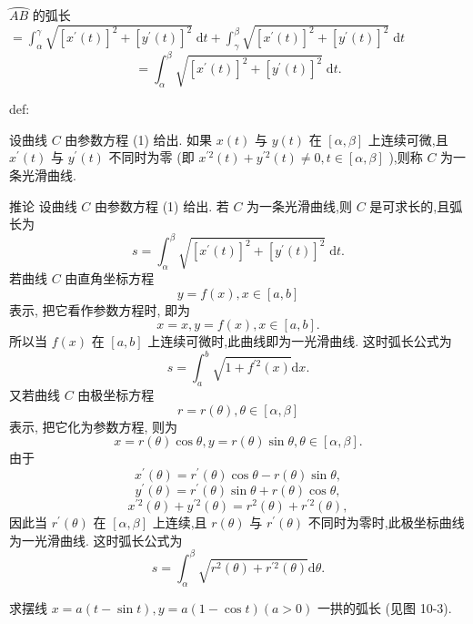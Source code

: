 \(\overset{⏜}{AB}\) 的弧长 \(= {\int }_{\alpha }^{\gamma }\sqrt{{\left\lbrack  {x}^{\prime }\left( t\right) \right\rbrack  }^{2} + {\left\lbrack  {y}^{\prime }\left( t\right) \right\rbrack  }^{2}}\mathrm{\;d}t + {\int }_{\gamma }^{\beta }\sqrt{{\left\lbrack  {x}^{\prime }\left( t\right) \right\rbrack  }^{2} + {\left\lbrack  {y}^{\prime }\left( t\right) \right\rbrack  }^{2}}\mathrm{\;d}t\)
\[
= {\int }_{\alpha }^{\beta }\sqrt{{\left\lbrack  {x}^{\prime }\left( t\right) \right\rbrack  }^{2} + {\left\lbrack  {y}^{\prime }\left( t\right) \right\rbrack  }^{2}}\mathrm{\;d}t.
\]
\begin{definition}{}{def:}

\end{definition}
设曲线 \(C\) 由参数方程 (1) 给出. 如果 \(x\left( t\right)\) 与 \(y\left( t\right)\) 在 \(\left\lbrack  {\alpha ,\beta }\right\rbrack\) 上连续可微,且 \({x}^{\prime }\left( t\right)\) 与 \({y}^{\prime }\left( t\right)\) 不同时为零 (即 \({x}^{\prime 2}\left( t\right)  + {y}^{\prime 2}\left( t\right)  \neq  0,t \in  \left\lbrack  {\alpha ,\beta }\right\rbrack\) ),则称 \(C\) 为一条光滑曲线.

推论 设曲线 \(C\) 由参数方程 (1) 给出. 若 \(C\) 为一条光滑曲线,则 \(C\) 是可求长的,且弧长为
\[
s = {\int }_{\alpha }^{\beta }\sqrt{{\left\lbrack  {x}^{\prime }\left( t\right) \right\rbrack  }^{2} + {\left\lbrack  {y}^{\prime }\left( t\right) \right\rbrack  }^{2}}\mathrm{\;d}t.
\]
若曲线 \(C\) 由直角坐标方程
\[
y = f\left( x\right) ,x \in  \left\lbrack  {a,b}\right\rbrack
\]
表示, 把它看作参数方程时, 即为
\[
x = x,y = f\left( x\right) ,x \in  \left\lbrack  {a,b}\right\rbrack  .
\]
所以当 \(f\left( x\right)\) 在 \(\left\lbrack  {a,b}\right\rbrack\) 上连续可微时,此曲线即为一光滑曲线. 这时弧长公式为
\[
s = {\int }_{a}^{b}\sqrt{1 + {f}^{\prime 2}\left( x\right) }\mathrm{d}x. \tag{4}
\]
又若曲线 \(C\) 由极坐标方程
\[
r = r\left( \theta \right) ,\theta  \in  \left\lbrack  {\alpha ,\beta }\right\rbrack
\]
表示, 把它化为参数方程, 则为
\[
x = r\left( \theta \right) \cos \theta ,y = r\left( \theta \right) \sin \theta ,\theta  \in  \left\lbrack  {\alpha ,\beta }\right\rbrack  .
\]
由于
\[
{x}^{\prime }\left( \theta \right)  = {r}^{\prime }\left( \theta \right) \cos \theta  - r\left( \theta \right) \sin \theta ,
\]
\[
{y}^{\prime }\left( \theta \right)  = {r}^{\prime }\left( \theta \right) \sin \theta  + r\left( \theta \right) \cos \theta ,
\]
\[
{x}^{\prime 2}\left( \theta \right)  + {y}^{\prime 2}\left( \theta \right)  = {r}^{2}\left( \theta \right)  + {r}^{\prime 2}\left( \theta \right) ,
\]
因此当 \({r}^{\prime }\left( \theta \right)\) 在 \(\left\lbrack  {\alpha ,\beta }\right\rbrack\) 上连续,且 \(r\left( \theta \right)\) 与 \({r}^{\prime }\left( \theta \right)\) 不同时为零时,此极坐标曲线为一光滑曲线. 这时弧长公式为
\[
s = {\int }_{\alpha }^{\beta }\sqrt{{r}^{2}\left( \theta \right)  + {r}^{\prime 2}\left( \theta \right) }\mathrm{d}\theta . \tag{5}
\]
\begin{example}

\end{example}
求摆线 \(x = a\left( {t - \sin t}\right) ,y = a\left( {1 - \cos t}\right) \left( {a > 0}\right)\) 一拱的弧长 (见图 10-3).

